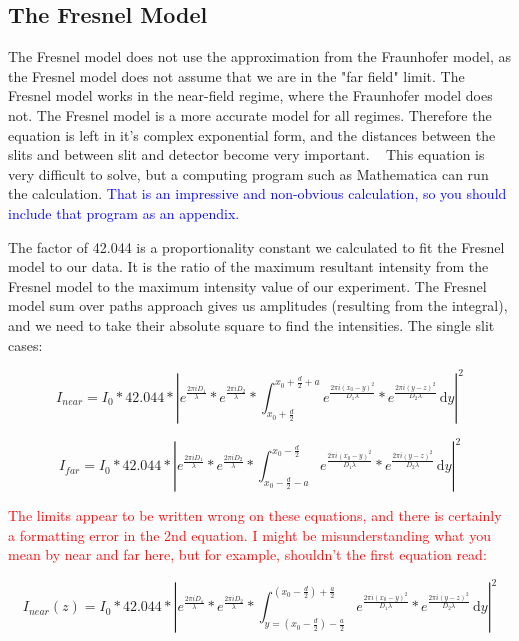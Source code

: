\documentclass[prb,preprint]{revtex4-1}
\begin{document}
\subsection{The Fresnel Model}

The Fresnel model does not use the approximation from the Fraunhofer model, as the Fresnel model does not assume that we are in the "far field" limit.  The Fresnel model works in the near-field regime, where the Fraunhofer model does not.  The Fresnel model is a more accurate model for all regimes.
Therefore the equation is left in it's complex exponential form, and the distances between the slits and between slit and detector become very important.  ~\cite{wolfram} This equation is very difficult to solve, but a computing program such as Mathematica can run the calculation.  \textcolor{blue}{That is an impressive and non-obvious calculation, so you should include that program as an appendix.} 

The factor of 42.044 is a proportionality constant we calculated to fit the Fresnel model to our data.  It is the ratio of the maximum resultant intensity from the Fresnel model to the maximum intensity value of our experiment.  The Fresnel model sum over paths approach gives us amplitudes (resulting from the integral), and we need to take their absolute square to find the intensities.
The single slit cases:

\begin{equation}
I_{near}=I_{0}*42.044*|e^{\frac{2 \pi i D_{1}}{\lambda}}*e^{\frac{2 \pi i D_{2}}{\lambda}}*\int_{x_{0}+\frac{d}{2}}^{x_{0}+\frac{d}{2}+a} \! e^{\frac{2 \pi i (x_{0}-y)^{2}}{D_{1} \lambda}}*e^{\frac{2 \pi i (y-z)^{2}}{D_{2} \lambda}} \, \mathrm{d}y |^{2}
\end{equation}

\begin{equation}
I_{far}=I_{0}*42.044*|e^{\frac{2 \pi i D_{1}}{\lambda}}*e^{\frac{2 \pi i D_{2}}{\lambda}}*\int_{x_{0}-\frac{d}{2}-a}^{x_{0}-\frac{d}{2}} \! e^{\frac{2 \pi i (x_{0}-y)^{2}}{D_{1} \lambda}}*e^{\frac{2 \pi i (y-z)^{2}}{D_{2} \lambda}} \, \mathrm{d}y |^{2}
\end{equation}

\textcolor{red}{The limits appear to be written wrong on these equations, and there is certainly a formatting error in the 2nd equation.  I might be misunderstanding what you mean by near and far here, but for example,  shouldn't the first equation read: }

\begin{equation*}
I_{near}(z)=I_{0}*42.044*|e^{\frac{2 \pi i D_{1}}{\lambda}}*e^{\frac{2 \pi i D_{2}}{\lambda}}*\int_{y = \left(x_{0}-\frac{d}{2}\right) - \frac{a}{2}}^{\left(x_{0}-\frac{d}{2}\right) + \frac{a}{2}} \! e^{\frac{2 \pi i (x_{0}-y)^{2}}{D_{1} \lambda}}*e^{\frac{2 \pi i (y-z)^{2}}{D_{2} \lambda}} \, \mathrm{d}y |^{2}
\end{equation*}
\end{document}
